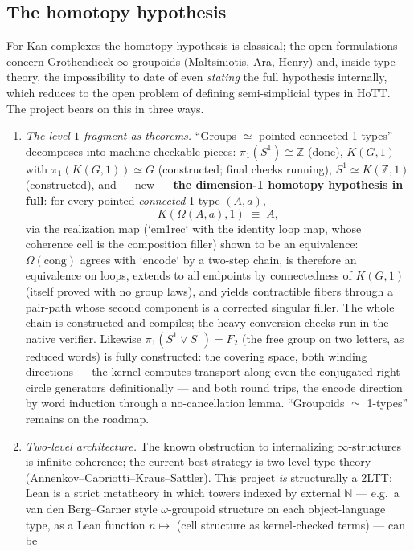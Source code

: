 \documentclass[11pt]{article}
\newcommand{\Z}{\mathbb{Z}}
\newcommand{\N}{\mathbb{N}}
\begin{document}
\subsection{The homotopy hypothesis}
For Kan complexes the homotopy hypothesis is classical; the open
formulations concern Grothendieck $\infty$-groupoids
(Maltsiniotis, Ara, Henry) and, inside type theory, the impossibility to
date of even \emph{stating} the full hypothesis internally, which reduces
to the open problem of defining semi-simplicial types in HoTT.  The
project bears on this in three ways.
\begin{enumerate}[leftmargin=1.7em]
\item \emph{The level-$1$ fragment as theorems.}  ``Groups $\simeq$
pointed connected 1-types'' decomposes into machine-checkable pieces:
$\pi_1(S^1)\cong\Z$ (done), $K(G,1)$ with $\pi_1(K(G,1))\simeq G$
(constructed; final checks running), $S^1\simeq K(\Z,1)$ (constructed),
and --- new --- \textbf{the dimension-1 homotopy hypothesis in full}:
for every pointed \emph{connected} 1-type $(A,a)$,
\[ K(\Omega(A,a),1) \;\equiv\; A, \]
via the realization map (`em1rec` with the identity loop map, whose
coherence cell is the composition filler) shown to be an equivalence:
$\Omega(\mathrm{cong})$ agrees with `encode` by a two-step chain, is
therefore an equivalence on loops, extends to all endpoints by
connectedness of $K(G,1)$ (itself proved with no group laws), and yields
contractible fibers through a pair-path whose second component is a
corrected singular filler.  The whole chain is constructed and compiles;
the heavy conversion checks run in the native verifier.  Likewise
$\pi_1(S^1\vee S^1) = F_2$ (the free group on two letters, as reduced
words) is fully constructed: the covering space, both winding directions
--- the kernel computes transport along even the conjugated right-circle
generators definitionally --- and both round trips, the encode direction
by word induction through a no-cancellation lemma.  ``Groupoids
$\simeq$ 1-types'' remains on the roadmap.
\item \emph{Two-level architecture.}  The known obstruction to
internalizing $\infty$-structures is infinite coherence; the current best
strategy is two-level type theory (Annenkov--Capriotti--Kraus--Sattler).
This project \emph{is} structurally a 2LTT: Lean is a strict metatheory
in which towers indexed by external $\N$ --- e.g.\ a van den Berg--Garner
style $\omega$-groupoid structure on each object-language type, as a Lean
function $n\mapsto$ (cell structure as kernel-checked terms) --- can be

\end{enumerate}
\end{document}
